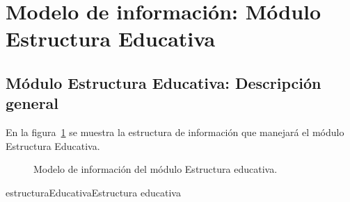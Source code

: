 
%


\section{Modelo de información: Módulo Estructura Educativa}
\subsection{Módulo Estructura Educativa: Descripción general}

En la figura~\ref{fig:estructuraEducativa} se muestra la estructura de información que manejará el módulo Estructura Educativa.

\begin{figure}[htbp!]
	\begin{center}
		\caption{Modelo de información del módulo Estructura educativa.}
		\label{fig:estructuraEducativa}
	\end{center}
\end{figure}

\begin{BusinessEntity}{estructuraEducativa}{Estructura educativa}
	
	
	
\end{BusinessEntity}



